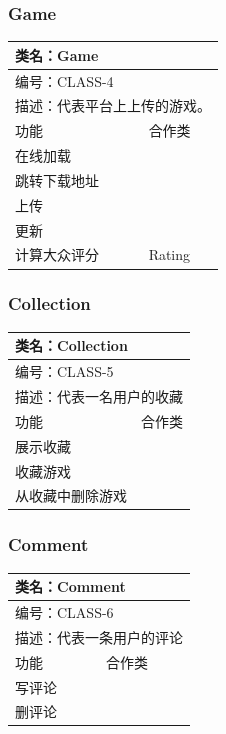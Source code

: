 \documentclass[12pt]{ctexart} %
\begin{document}
\subsubsection{Game}
\begin{tabular}{|l|l|}
  \hline
  \multicolumn{2}{|l|}{类名：Game} \\
  \hline
  \multicolumn{2}{|l|}{编号：CLASS-4} \\
  \hline
  \multicolumn{2}{|l|}{描述：代表平台上上传的游戏。} \\
  \hline
  功能 & 合作类 \\
  \hline
  在线加载 & \\
  \hline
  跳转下载地址 & \\
  \hline
  上传 &  \\
  \hline
  更新 &  \\
  \hline
  计算大众评分 & Rating \\
  \hline
  \end{tabular}

\subsubsection{Collection}
\begin{tabular}{|l|l|}
  \hline
  \multicolumn{2}{|l|}{类名：Collection} \\
  \hline
  \multicolumn{2}{|l|}{编号：CLASS-5} \\
  \hline
  \multicolumn{2}{|l|}{描述：代表一名用户的收藏} \\
  \hline
  功能 & 合作类 \\
  \hline
  展示收藏 &  \\
  \hline
  收藏游戏 & \\
  \hline
  从收藏中删除游戏 & \\
  \hline
  \end{tabular}

\subsubsection{Comment}
\begin{tabular}{|l|l|}
  \hline
  \multicolumn{2}{|l|}{类名：Comment} \\
  \hline
  \multicolumn{2}{|l|}{编号：CLASS-6} \\
  \hline
  \multicolumn{2}{|l|}{描述：代表一条用户的评论} \\
  \hline
  功能 & 合作类 \\
  \hline
  写评论 & \\
  \hline
  删评论 & \\
  \hline
  \end{tabular}
\end{document}
